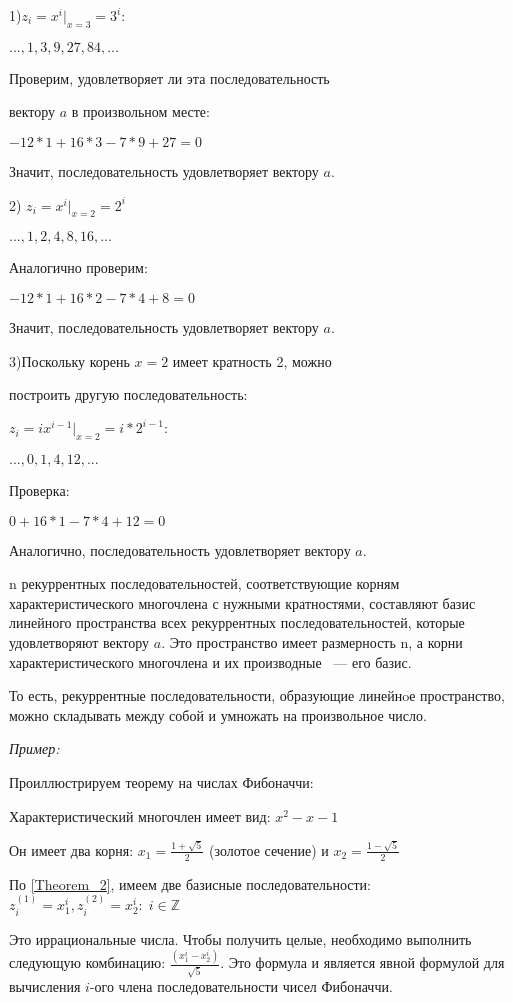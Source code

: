 \documentclass[russian]{lecture-notes}
\begin{document}
1)$z_i=x^i|_{x=3}=3^i:$


$..., 1, 3, 9, 27, 84, ...$

Проверим, удовлетворяет ли эта последовательность

вектору $a$ в произвольном месте:

$-12*1+16*3-7*9+27=0$

Значит, последовательность удовлетворяет вектору $a$.

2) $z_i=x^i|_{x=2}=2^i$

$..., 1, 2, 4, 8, 16, ...$

Аналогично проверим:

$ -12*1+16*2-7*4+8=0$

Значит, последовательность удовлетворяет вектору $a$.

3)Поскольку корень $x=2$ имеет кратность 2, можно

построить другую последовательность:

$z_i=ix^{i-1}|_{x=2}=i*2^{i-1}:$

$..., 0, 1, 4, 12, ...$

Проверка:

$0+16*1-7*4+12=0$

Аналогично, последовательность удовлетворяет вектору $a$.
\\
\begin{Theorem}
	n рекуррентных последовательностей, соответствующие корням характеристического многочлена с нужными кратностями, составляют базис линейного пространства всех рекуррентных последовательностей, которые удовлетворяют вектору $a$. Это пространство имеет размерность n, а корни характеристического многочлена и их производные ~--- его базис.
	\label{Theorem_2}
\end{Theorem}


 То есть, рекуррентные последовательности, образующие линейнoе пространство, можно складывать между собой и умножать на произвольное число.


\emph{Пример:}

 Проиллюстрируем теорему на числах Фибоначчи:

Характеристический многочлен имеет вид: $x^2-x-1$

 Он имеет два корня: $x_1=\frac{1+\sqrt{5}}{2}$ \; (золотое сечение) и $x_2=\frac{1-\sqrt{5}}{2}$

 По \ref{Theorem_2}, имеем две базисные  последовательности: $z^{(1)}_i=x^i_1, z^{(2)}_i=x^i_2: \; i\in \mathbb{Z}$

Это иррациональные числа. Чтобы получить целые, необходимо выполнить следующую комбинацию: $\frac{(x^i_1-x^i_2)}{\sqrt5}$. Это формула и является явной формулой для вычисления $i$-ого члена последовательности чисел Фибоначчи.
\end{document}
